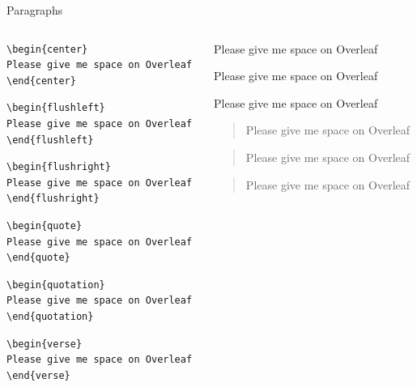 \documentclass{beamer}
\begin{document}
\begin{frame}[fragile]{Paragraphs}
\begin{columns}
\begin{column}{6cm}
\vspace{-0.3cm}
\begin{lstlisting}
\begin{center}
Please give me space on Overleaf
\end{center}
\end{lstlisting}
\begin{lstlisting}
\begin{flushleft}
Please give me space on Overleaf
\end{flushleft}
\end{lstlisting}
\begin{lstlisting}
\begin{flushright}
Please give me space on Overleaf
\end{flushright}
\end{lstlisting}
\begin{lstlisting}
\begin{quote}
Please give me space on Overleaf
\end{quote}
\end{lstlisting}
\begin{lstlisting}
\begin{quotation}
Please give me space on Overleaf
\end{quotation}
\end{lstlisting}
\begin{lstlisting}
\begin{verse}
Please give me space on Overleaf
\end{verse}
\end{lstlisting}
\end{column}
\begin{column}{4cm}
\vspace{-0.5cm}
\footnotesize
\begin{center}
Please give me space on Overleaf
\end{center}
\begin{flushleft}
Please give me space on Overleaf
\end{flushleft}
\begin{flushright}
Please give me space on Overleaf
\end{flushright}
\begin{quote}
Please give me space on Overleaf
\end{quote}
\begin{quotation}
Please give me space on Overleaf
\end{quotation}
\begin{verse}
Please give me space on Overleaf
\end{verse}
\end{column}
\end{columns}
\end{frame}
\end{document}
